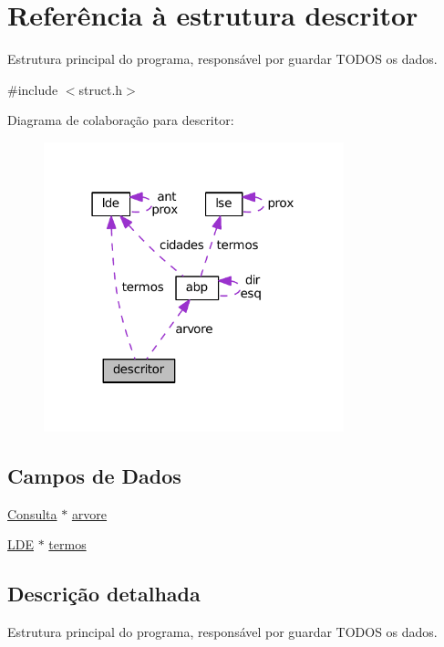 \hypertarget{structdescritor}{}\section{Referência à estrutura descritor}
\label{structdescritor}


Estrutura principal do programa, responsável por guardar T\+O\+D\+OS os dados.  




{\ttfamily \#include $<$struct.\+h$>$}



Diagrama de colaboração para descritor\+:\nopagebreak
\begin{figure}[H]
\begin{center}
\leavevmode
\includegraphics[width=247pt]{structdescritor__coll__graph}
\end{center}
\end{figure}
\subsection*{Campos de Dados}
\begin{DoxyCompactItemize}
\item 
\hyperlink{struct_8h_a1664119ce88635d3bf4655a988ef8248}{Consulta} $\ast$ \hyperlink{structdescritor_a523b6d27352566be093cada88aa655d4}{arvore}
\item 
\hyperlink{struct_8h_ae030205799002e4fc414e374283d8598}{L\+DE} $\ast$ \hyperlink{structdescritor_a4f74c1b0743b541ef2b21dec4fa4da2e}{termos}
\end{DoxyCompactItemize}


\subsection{Descrição detalhada}
Estrutura principal do programa, responsável por guardar T\+O\+D\+OS os dados. 

